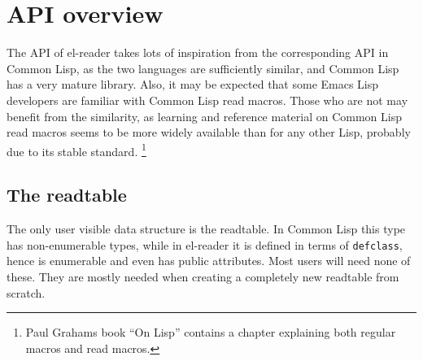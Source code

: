 \documentclass[a4paper]{article}
\newcommand{\el}{Emacs Lisp}
\newcommand{\cl}{Common Lisp}
\newcommand{\elr}{el-reader}
\newcommand{\fun}[1]{\texttt{#1}}
\begin{document}
\section{API overview}
\label{sec:api-overview}

The API of \elr{} takes lots of inspiration from the corresponding API in
\cl{}, as the two languages are sufficiently similar, and \cl{} has a very
mature library.  Also, it may be expected that some \el{} developers are
familiar with \cl{} read macros.  Those who are not may benefit from the
similarity, as learning and reference material on \cl{} read macros seems to be
more widely available than for any other Lisp, probably due to its stable
standard.  \footnote{Paul Grahams book ``On Lisp''\cite[p.~224]{on-lisp}
  contains a chapter explaining both regular macros and read macros.}

\subsection{The readtable}
\label{subsec:readtable}

The only user visible data structure is the readtable.  In \cl{} this type has
non-enumerable types, while in \elr{} it is defined in terms of
\fun{defclass}, hence is enumerable and even has public attributes.  Most users
will need none of these.  They are mostly needed when creating a completely new
readtable from scratch.






\end{document}
